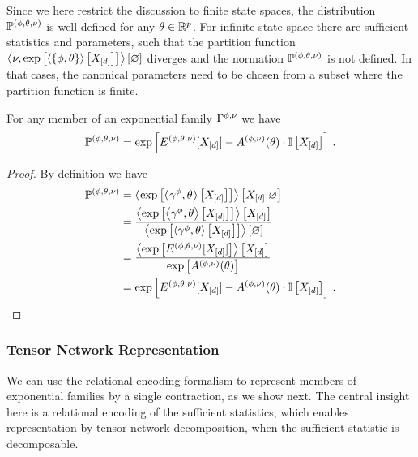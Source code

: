 
Since we here restrict the discussion to finite state spaces, the distribution $\mathbb{P}^{(\phi,\theta,\nu)}$ is well-defined for any $\theta\in\mathbb{R}^{p}$.
For infinite state space there are sufficient statistics and parameters, such that the partition function $\left\langle \nu,\mathrm{exp}\left[\left\langle \{\phi,\theta\}\right\rangle \left[ X_{[d]} \right]\right]\right\rangle \left[ \varnothing \right]$ diverges and the normation $\mathbb{P}^{(\phi,\theta,\nu)}$ is not defined.
In that cases, the canonical parameters need to be chosen from a subset where the partition function is finite. 

\begin{lemma}\label{lem:energyCumulantRepresentation}
	For any member of an exponential family $\Gamma^{\phi,\nu}$ we have
		\[ \mathbb{P}^{(\phi,\theta,\nu)} = \mathrm{exp}\left[ E^{(\phi,\theta,\nu)}[X_{[d]}] - A^{(\phi,\nu)}(\theta)\cdot \mathbb{I}\left[X_{[d]}\right]\right] \, . \]
\end{lemma}
\begin{proof}
	By definition we have
	\begin{align*}
		\mathbb{P}^{(\phi,\theta,\nu)} 
		&= \left\langle 
		\mathrm{exp}\left[\left\langle \gamma^{\phi},\theta\right\rangle \left[ X_{[d]} \right]\right]
		\right\rangle \left[ X_{[d]} | \varnothing \right] \\
		&= \frac{\left\langle \mathrm{exp}\left[\left\langle \gamma^{\phi},\theta\right\rangle \left[ X_{[d]} \right]\right]\right\rangle \left[ X_{[d]} \right]
			}{\left\langle \mathrm{exp}\left[\left\langle \gamma^{\phi},\theta	\right\rangle \left[ X_{[d]} \right]\right]\right\rangle \left[ \varnothing \right]} \\
		&=  \frac{
		\left\langle \mathrm{exp}\left[E^{(\phi,\theta,\nu)}[X_{[d]}]\right]\right\rangle \left[ X_{[d]} \right]
		}{
		\mathrm{exp}\left[A^{(\phi,\nu)}(\theta)\right]
		} \\
		& = \mathrm{exp}\left[ E^{(\phi,\theta,\nu)}[X_{[d]}] - A^{(\phi,\nu)}(\theta)\cdot \mathbb{I}\left[X_{[d]}\right]\right] \, . 
	\end{align*}
\end{proof}


\subsubsection{Tensor Network Representation} 

We can use the relational encoding formalism to represent members of exponential families by a single contraction, as we show next.
The central insight here is a relational encoding of the sufficient statistics, which enables representation by tensor network decomposition, when the sufficient statistic is decomposable.

